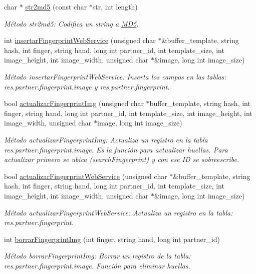 \begin{DoxyCompactItemize}
char $\ast$ \hyperlink{classFingerprint_aefb69bba57960202c3763d61416be5d7}{str2md5} (const char $\ast$str, int length)
\begin{DoxyCompactList}\small\item\em Método str2md5\+: Codifica un string a \hyperlink{classMD5}{M\+D5}. \end{DoxyCompactList}\item 
int \hyperlink{classFingerprint_a049f81227a4f59f459c2f52627f12d76}{insertar\+Fingerprint\+Web\+Service} (unsigned char $\ast$\&buffer\+\_\+template, string hash, int finger, string hand, long int partner\+\_\+id, int template\+\_\+size, int image\+\_\+height, int image\+\_\+width, unsigned char $\ast$\&image, long int image\+\_\+size)
\begin{DoxyCompactList}\small\item\em Método insertar\+Fingerprint\+Web\+Service\+: Inserta los campos en las tablas\+: res.\+partner.\+fingerprint.\+image y res.\+partner.\+fingerprint. \end{DoxyCompactList}\item 
bool \hyperlink{classFingerprint_a5194ba2b4266c2d030ac2a7d41778aad}{actualizar\+Fingerprint\+Img} (unsigned char $\ast$buffer\+\_\+template, string hash, int finger, string hand, long int partner\+\_\+id, int template\+\_\+size, int image\+\_\+height, int image\+\_\+width, unsigned char $\ast$image, long int image\+\_\+size)
\begin{DoxyCompactList}\small\item\em Método actualizar\+Fingerprint\+Img\+: Actualiza un registro en la tabla res.\+partner.\+fingerprint.\+image. Es la función para actualizar huellas. Para actualizar primero se ubica (search\+Fingerprint) y con ese ID se sobreescribe. \end{DoxyCompactList}\item 
bool \hyperlink{classFingerprint_abbe118d1fdaaba8d64c6e17320c7c835}{actualizar\+Fingerprint\+Web\+Service} (unsigned char $\ast$\&buffer\+\_\+template, string hash, int finger, string hand, long int partner\+\_\+id, int template\+\_\+size, int image\+\_\+height, int image\+\_\+width, unsigned char $\ast$\&image, long int image\+\_\+size)
\begin{DoxyCompactList}\small\item\em Método actualizar\+Fingerprint\+Web\+Service\+: Actualiza un registro en la tabla\+: res.\+partner.\+fingerprint. \end{DoxyCompactList}\item 
int \hyperlink{classFingerprint_a991f8682bd5fb908804eb35e2c584d17}{borrar\+Fingerprint\+Img} (int finger, string hand, long int partner\+\_\+id)
\begin{DoxyCompactList}\small\item\em Método borrar\+Fingerprint\+Img\+: Borrar un registro de la tabla\+: res.\+partner.\+fingerprint.\+image. Función para eliminar huellas. \end{DoxyCompactList}\end{DoxyCompactItemize}
